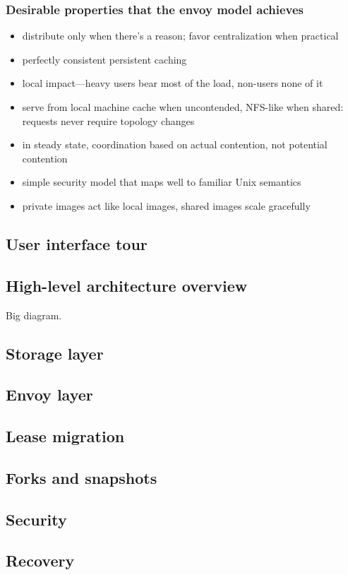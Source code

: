 \documentclass[a4paper,12pt]{article}
\begin{document}
\subsubsection{Desirable properties that the envoy model achieves}
\begin{itemize}
\item distribute only when there's a reason; favor centralization when practical
\item perfectly consistent persistent caching
\item local impact---heavy users bear most of the load, non-users none of it
\item serve from local machine cache when uncontended, NFS-like when shared: requests never require topology changes
\item in steady state, coordination based on actual contention, not potential contention
\item simple security model that maps well to familiar Unix semantics
\item private images act like local images, shared images scale gracefully
\end{itemize}

\subsection{User interface tour}
\subsection{High-level architecture overview}
Big diagram.
\subsection{Storage layer}
\subsection{Envoy layer}
\subsection{Lease migration}
\subsection{Forks and snapshots}
\subsection{Security}
\subsection{Recovery}
\end{document}
